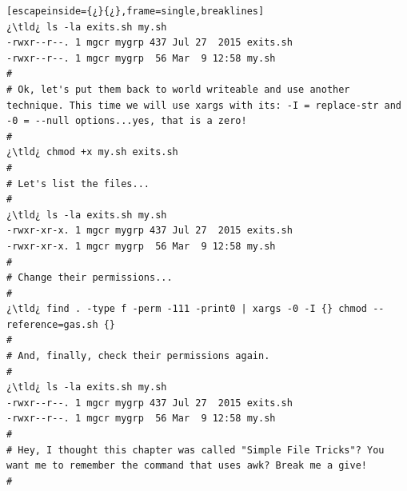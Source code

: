 \begin{lstlisting}[escapeinside={¿}{¿},frame=single,breaklines]
¿\tld¿ ls -la exits.sh my.sh
-rwxr--r--. 1 mgcr mygrp 437 Jul 27  2015 exits.sh
-rwxr--r--. 1 mgcr mygrp  56 Mar  9 12:58 my.sh
#
# Ok, let's put them back to world writeable and use another technique. This time we will use xargs with its: -I = replace-str and -0 = --null options...yes, that is a zero!
#
¿\tld¿ chmod +x my.sh exits.sh
#
# Let's list the files...
#
¿\tld¿ ls -la exits.sh my.sh
-rwxr-xr-x. 1 mgcr mygrp 437 Jul 27  2015 exits.sh
-rwxr-xr-x. 1 mgcr mygrp  56 Mar  9 12:58 my.sh
#
# Change their permissions...
#
¿\tld¿ find . -type f -perm -111 -print0 | xargs -0 -I {} chmod --reference=gas.sh {}
#
# And, finally, check their permissions again.
#
¿\tld¿ ls -la exits.sh my.sh
-rwxr--r--. 1 mgcr mygrp 437 Jul 27  2015 exits.sh
-rwxr--r--. 1 mgcr mygrp  56 Mar  9 12:58 my.sh
#
# Hey, I thought this chapter was called "Simple File Tricks"? You want me to remember the command that uses awk? Break me a give!
#
\end{lstlisting}
